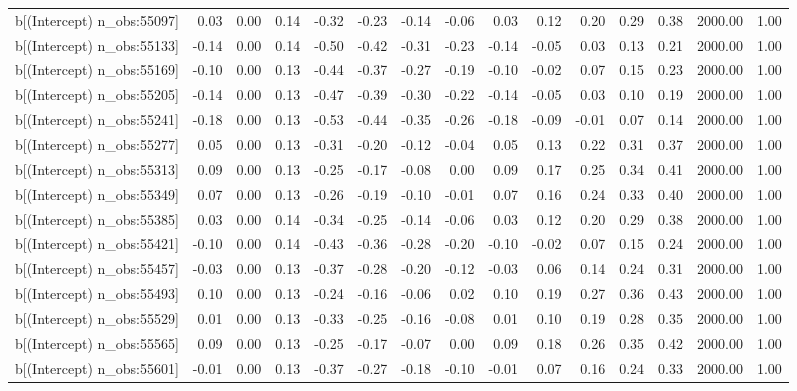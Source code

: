 \begin{table}[ht]
\begin{tabular}{rrrrrrrrrrrrrrr}
  b[(Intercept) n\_obs:55097] & 0.03 & 0.00 & 0.14 & -0.32 & -0.23 & -0.14 & -0.06 & 0.03 & 0.12 & 0.20 & 0.29 & 0.38 & 2000.00 & 1.00 \\ 
  b[(Intercept) n\_obs:55133] & -0.14 & 0.00 & 0.14 & -0.50 & -0.42 & -0.31 & -0.23 & -0.14 & -0.05 & 0.03 & 0.13 & 0.21 & 2000.00 & 1.00 \\ 
  b[(Intercept) n\_obs:55169] & -0.10 & 0.00 & 0.13 & -0.44 & -0.37 & -0.27 & -0.19 & -0.10 & -0.02 & 0.07 & 0.15 & 0.23 & 2000.00 & 1.00 \\ 
  b[(Intercept) n\_obs:55205] & -0.14 & 0.00 & 0.13 & -0.47 & -0.39 & -0.30 & -0.22 & -0.14 & -0.05 & 0.03 & 0.10 & 0.19 & 2000.00 & 1.00 \\ 
  b[(Intercept) n\_obs:55241] & -0.18 & 0.00 & 0.13 & -0.53 & -0.44 & -0.35 & -0.26 & -0.18 & -0.09 & -0.01 & 0.07 & 0.14 & 2000.00 & 1.00 \\ 
  b[(Intercept) n\_obs:55277] & 0.05 & 0.00 & 0.13 & -0.31 & -0.20 & -0.12 & -0.04 & 0.05 & 0.13 & 0.22 & 0.31 & 0.37 & 2000.00 & 1.00 \\ 
  b[(Intercept) n\_obs:55313] & 0.09 & 0.00 & 0.13 & -0.25 & -0.17 & -0.08 & 0.00 & 0.09 & 0.17 & 0.25 & 0.34 & 0.41 & 2000.00 & 1.00 \\ 
  b[(Intercept) n\_obs:55349] & 0.07 & 0.00 & 0.13 & -0.26 & -0.19 & -0.10 & -0.01 & 0.07 & 0.16 & 0.24 & 0.33 & 0.40 & 2000.00 & 1.00 \\ 
  b[(Intercept) n\_obs:55385] & 0.03 & 0.00 & 0.14 & -0.34 & -0.25 & -0.14 & -0.06 & 0.03 & 0.12 & 0.20 & 0.29 & 0.38 & 2000.00 & 1.00 \\ 
  b[(Intercept) n\_obs:55421] & -0.10 & 0.00 & 0.14 & -0.43 & -0.36 & -0.28 & -0.20 & -0.10 & -0.02 & 0.07 & 0.15 & 0.24 & 2000.00 & 1.00 \\ 
  b[(Intercept) n\_obs:55457] & -0.03 & 0.00 & 0.13 & -0.37 & -0.28 & -0.20 & -0.12 & -0.03 & 0.06 & 0.14 & 0.24 & 0.31 & 2000.00 & 1.00 \\ 
  b[(Intercept) n\_obs:55493] & 0.10 & 0.00 & 0.13 & -0.24 & -0.16 & -0.06 & 0.02 & 0.10 & 0.19 & 0.27 & 0.36 & 0.43 & 2000.00 & 1.00 \\ 
  b[(Intercept) n\_obs:55529] & 0.01 & 0.00 & 0.13 & -0.33 & -0.25 & -0.16 & -0.08 & 0.01 & 0.10 & 0.19 & 0.28 & 0.35 & 2000.00 & 1.00 \\ 
  b[(Intercept) n\_obs:55565] & 0.09 & 0.00 & 0.13 & -0.25 & -0.17 & -0.07 & 0.00 & 0.09 & 0.18 & 0.26 & 0.35 & 0.42 & 2000.00 & 1.00 \\ 
  b[(Intercept) n\_obs:55601] & -0.01 & 0.00 & 0.13 & -0.37 & -0.27 & -0.18 & -0.10 & -0.01 & 0.07 & 0.16 & 0.24 & 0.33 & 2000.00 & 1.00 \\ 

\end{tabular}
\end{table}
